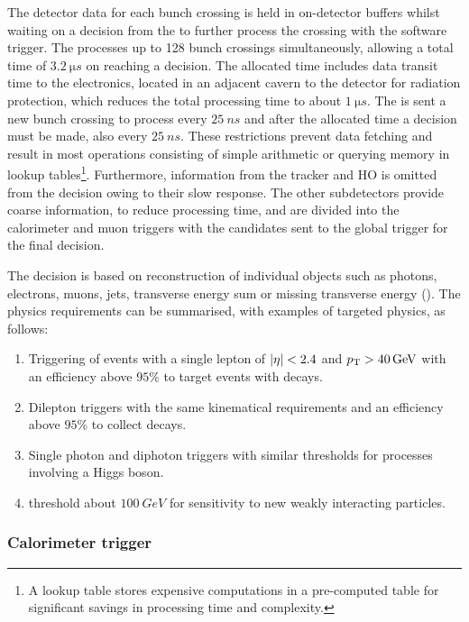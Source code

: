 The detector data for each bunch crossing is held in on-detector buffers
whilst waiting on a decision from the \HWT to further process the crossing
with the software trigger. The \HWT processes up to 128 bunch crossings
simultaneously, allowing a total time of ${\SI{3.2}{\micro s}}$ on reaching a
decision. The allocated time includes data transit time to the electronics,
located in an adjacent cavern to the detector for radiation protection, which
reduces the total processing time to about ${\SI{1}{\micro s}}$. The \HWT is
sent a new bunch crossing to process every ${\SI{25}{ns}}$ and after the
allocated time a decision must be made, also every ${\SI{25}{ns}}$. These
restrictions prevent data fetching and result in most operations consisting of
simple arithmetic or querying memory in lookup tables\footnote{A lookup table
stores expensive computations in a pre-computed table for significant savings
in processing time and complexity.}. Furthermore, information from the tracker
and HO is omitted from the \HWT decision owing to their slow response. The
other subdetectors provide coarse information, to reduce processing time, and
are divided into the calorimeter and muon triggers with the candidates sent to
the global trigger for the final decision.

The \HWT decision is based on reconstruction of individual objects such as
photons, electrons, muons, jets, transverse energy sum or missing transverse
energy (\etmiss). The physics requirements can be summarised, with examples of
targeted physics, as follows:

\begin{enumerate}
    \item Triggering of events with a single lepton of ${|\eta|<2.4}$ and
    ${p_{\text{T}}>\SI{40}{GeV}}$ with an efficiency above $95\%$ to target events with
    \PW decays.
    \item Dilepton triggers with the same kinematical requirements and an
    efficiency above $95\%$ to collect \PZ decays.
    \item Single photon and diphoton triggers with similar thresholds for
    processes involving a Higgs boson.
    \item \etmiss threshold about ${\SI{100}{GeV}}$ for sensitivity to new
    weakly interacting particles.
\end{enumerate}


\subsubsection{Calorimeter trigger}

